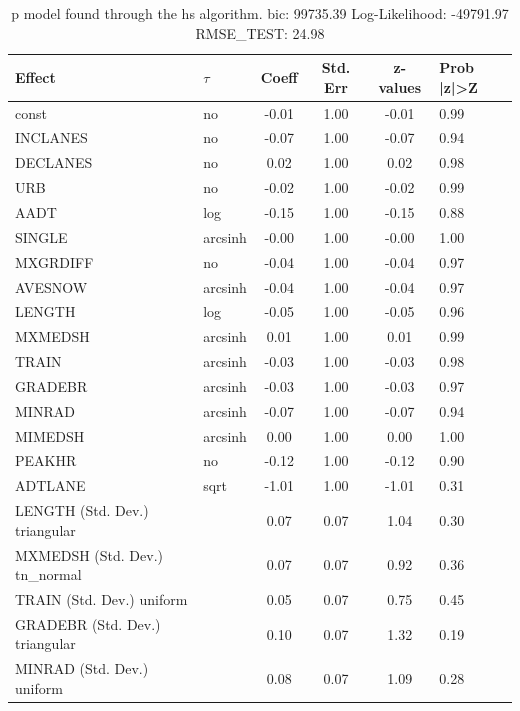 \begin{table}
	\caption{p model found through the hs algorithm. bic: 99735.39 Log-Likelihood: -49791.97 RMSE_TEST: 24.98}
	\begin{center}
		\begin{tabular}{|l|l|c|c|c|l|}
			\hline
			Effect & $\tau$ & Coeff & Std. Err & z-values & Prob |z|>Z \\
			\hline
			const & no & -0.01 & 1.00 & -0.01 & 0.99 \\
			\hline
			INCLANES & no & -0.07 & 1.00 & -0.07 & 0.94 \\
			\hline
			DECLANES & no & 0.02 & 1.00 & 0.02 & 0.98 \\
			\hline
			URB & no & -0.02 & 1.00 & -0.02 & 0.99 \\
			\hline
			AADT & log & -0.15 & 1.00 & -0.15 & 0.88 \\
			\hline
			SINGLE & arcsinh & -0.00 & 1.00 & -0.00 & 1.00 \\
			\hline
			MXGRDIFF & no & -0.04 & 1.00 & -0.04 & 0.97 \\
			\hline
			AVESNOW & arcsinh & -0.04 & 1.00 & -0.04 & 0.97 \\
			\hline
			LENGTH & log & -0.05 & 1.00 & -0.05 & 0.96 \\
			\hline
			MXMEDSH & arcsinh & 0.01 & 1.00 & 0.01 & 0.99 \\
			\hline
			TRAIN & arcsinh & -0.03 & 1.00 & -0.03 & 0.98 \\
			\hline
			GRADEBR & arcsinh & -0.03 & 1.00 & -0.03 & 0.97 \\
			\hline
			MINRAD & arcsinh & -0.07 & 1.00 & -0.07 & 0.94 \\
			\hline
			MIMEDSH & arcsinh & 0.00 & 1.00 & 0.00 & 1.00 \\
			\hline
			PEAKHR & no & -0.12 & 1.00 & -0.12 & 0.90 \\
			\hline
			ADTLANE & sqrt & -1.01 & 1.00 & -1.01 & 0.31 \\
			\hline
			LENGTH (Std. Dev.) triangular &  & 0.07 & 0.07 & 1.04 & 0.30 \\
			\hline
			MXMEDSH (Std. Dev.) tn_normal &  & 0.07 & 0.07 & 0.92 & 0.36 \\
			\hline
			TRAIN (Std. Dev.) uniform &  & 0.05 & 0.07 & 0.75 & 0.45 \\
			\hline
			GRADEBR (Std. Dev.) triangular &  & 0.10 & 0.07 & 1.32 & 0.19 \\
			\hline
			MINRAD (Std. Dev.) uniform &  & 0.08 & 0.07 & 1.09 & 0.28 \\
			\hline

\end{tabular}
\end{center}
\end{table}

